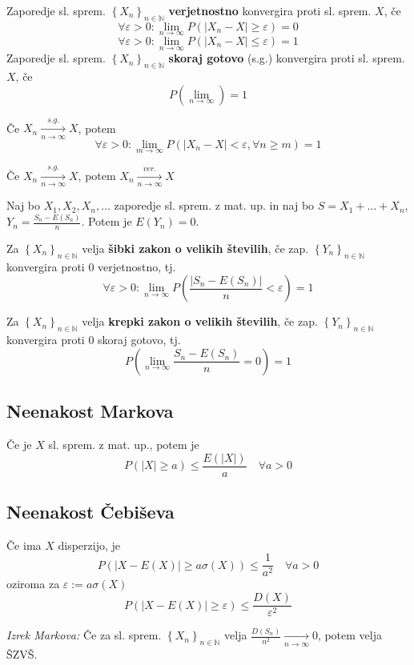 \begin{multicols}{5}
Zaporedje sl. sprem. $\left\{X_n\right\}_{n\in \mathbb{N}}$ \textbf{verjetnostno} konvergira proti sl. sprem. $X$, če
\[\forall \varepsilon > 0: \lim_{n \to \infty} P(|X_n - X| \geq \varepsilon) = 0\]
\[\forall \varepsilon > 0: \lim_{n \to \infty} P(|X_n - X| \leq \varepsilon) = 1\]
Zaporedje sl. sprem. $\left\{X_n\right\}_{n\in \mathbb{N}}$ \textbf{skoraj gotovo} (s.g.) konvergira proti sl. sprem. $X$, če
\[ P(\lim_{n \to \infty}) = 1 \]

Če $X_n \xrightarrow[n \to \infty]{s.g.} X$, potem
\[\forall \varepsilon > 0: \lim_{m \to \infty} P(|X_n - X| < \varepsilon, \forall n \geq m) = 1\]

Če $X_n \xrightarrow[n \to \infty]{s.g.} X$, potem $X_n \xrightarrow[n \to \infty]{ver.} X$


Naj bo $X_1, X_2, X_n, \dots$ zaporedje sl. sprem. z mat. up. in naj bo $S = X_1 +\dots + X_n$, $Y_n = \frac{S_n - E(S_n)}{n}$. Potem je $E(Y_n) = 0$.

Za $\left\{ X_n \right\}_{n \in \mathbb{N}} $ velja \textbf{šibki zakon o velikih številih}, če zap. $\left\{ Y_n \right\}_{n \in \mathbb{N}}$
konvergira proti 0 verjetnostno, tj.
\[ \forall \varepsilon > 0: \lim_{n \to \infty} P\left(  \frac{|S_n - E(S_n)|}{n} < \varepsilon \right) = 1 \]

Za $\left\{ X_n \right\}_{n \in \mathbb{N}} $ velja \textbf{krepki zakon o velikih številih}, če zap. $\left\{ Y_n \right\}_{n \in \mathbb{N}}$
konvergira proti 0 skoraj gotovo, tj.
\[ P\left( \lim_{n \to \infty} \frac{S_n - E(S_n)}{n} = 0 \right) = 1 \]

\subsection{Neenakost Markova}
Če je $X$ sl. sprem. z mat. up., potem je
\[P(|X| \geq a) \leq \frac{E(|X|)}{a} \quad \forall a > 0\]

\subsection{Neenakost Čebiševa}
Če ima $X$ disperzijo, je
\[ P(|X - E(X)| \geq a \sigma(X)) \leq \frac{1}{a^2}  \quad \forall a > 0\]
oziroma za $\varepsilon := a \sigma(X)$
\[ P(|X-E(X)| \geq \varepsilon) \leq \frac{D(X)}{\varepsilon^2}\]

\textit{Izrek Markova:}
Če za sl. sprem. $\left\{ X_n \right\}_{n \in \mathbb{N}} $ velja $\frac{D(S_n)}{n^2} \xrightarrow[n \to \infty]{} 0$, potem velja ŠZVŠ.


\end{multicols}

